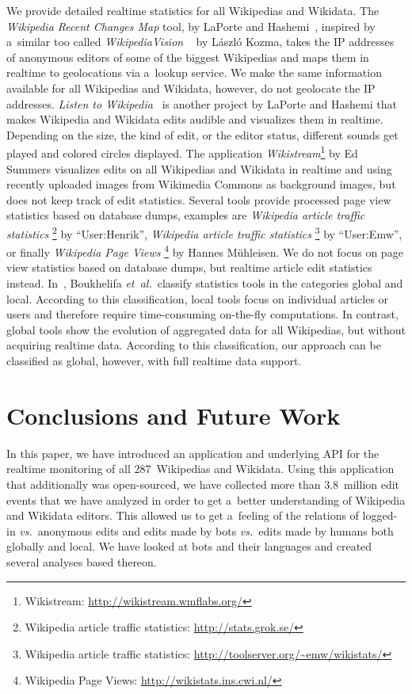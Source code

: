 \documentclass{sig-alternate}
\newcommand{\inlinelistingsize}{\fontsize{8pt}{11pt}}
\let\oldurl\url
\renewcommand{\url}[1]{\inlinelistingsize\oldurl{#1}}
\begin{document}
We provide detailed realtime statistics for all Wikipedias and Wikidata.
The \emph{Wikipedia Recent Changes Map} tool,
by LaPorte and Hashemi~\cite{laporte2013map},
inspired by a~similar too called \emph{WikipediaVision}%
~\cite{kozma2013map} by László Kozma,
takes the IP addresses of anonymous editors
of some of the biggest Wikipedias and maps them
in realtime to geolocations via a~lookup service.
We make the same information available
for all Wikipedias and Wikidata, however,
do not geolocate the IP addresses.
\emph{Listen to Wikipedia}~\cite{laporte2013listen}
is another project by
LaPorte and Hashemi that makes Wikipedia and Wikidata edits
audible and visualizes them in realtime.
Depending on the size, the kind of edit, or the editor status,
different sounds get played and colored circles displayed.
The application \emph{Wikistream}\footnote{Wikistream:
\url{http://wikistream.wmflabs.org/}} by Ed Summers
visualizes edits on all Wikipedias and Wikidata
in realtime and using recently uploaded images from Wikimedia Commons
as background images, but does not keep track of edit statistics.
Several tools provide processed page view statistics
based on database dumps, examples are
\emph{Wikipedia article traffic statistics}%
\footnote{Wikipedia article traffic statistics:
\url{http://stats.grok.se/}} by ``User:Henrik'',
\emph{Wikipedia article traffic statistics}%
\footnote{Wikipedia article traffic statistics:
\url{http://toolserver.org/~emw/wikistats/}} by ``User:Emw'',
or finally \emph{Wikipedia Page Views}%
\footnote{Wikipedia Page Views: \url{http://wikistats.ins.cwi.nl/}}
by Hannes Mühleisen.
We do not focus on page view statistics based on database dumps,
but realtime article edit statistics instead.
In~\cite{boukhelifa2010realtime}, Boukhelifa \emph{et~al.}\
classify statistics tools in the categories global and local.
According to this classification,
local tools focus on individual articles or users
and therefore require time-consuming on-the-fly computations.
In contrast,  global tools
show the evolution of aggregated data
for all Wikipedias,
but without acquiring realtime data.
According to this classification, our approach can be
classified as global, however, with full realtime data support.

\section{Conclusions and Future Work}

In this paper, we have introduced an application
and underlying API for the realtime monitoring
of all 287~Wikipedias and Wikidata.
Using this application that additionally was open-sourced,
we have collected more than 3.8~million edit events
that we have analyzed in order to get a~better understanding
of Wikipedia and Wikidata editors.
This allowed us to get a~feeling of the relations of
logged-in \emph{vs.}\ anonymous edits
and edits made by bots \emph{vs.}\ edits made by humans
both globally and local.
We have looked at bots and their languages
and created several analyses based thereon.
\end{document}
